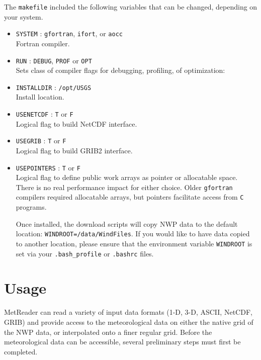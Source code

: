 \documentclass[11pt]{article}   %
\begin{document}
The \texttt{makefile} included the following variables that can be changed, depending on your
system.
\begin{itemize}
\item \texttt{SYSTEM} : \texttt{gfortran}, \texttt{ifort}, or \texttt{aocc}\\
Fortran compiler.
\item \texttt{RUN} : \texttt{DEBUG}, \texttt{PROF} or \texttt{OPT}\\
Sets class of compiler flags for debugging, profiling, of optimization:
\item \texttt{INSTALLDIR} : \texttt{/opt/USGS} \\
Install location.
\item \texttt{USENETCDF} : \texttt{T} or \texttt{F}\\
Logical flag to build NetCDF interface.
\item \texttt{USEGRIB} : \texttt{T} or \texttt{F}\\
Logical flag to build GRIB2 interface.
\item \texttt{USEPOINTERS} : \texttt{T} or \texttt{F}\\
Logical flag to define public work arrays as pointer or allocatable space. There is no
real performance impact for either choice. Older \texttt{gfortran} compilers
required allocatable arrays, but pointers facilitate access from \texttt{C} programs.

Once installed, the download scripts will copy NWP data to the default location:
\texttt{WINDROOT=/data/WindFiles}.  If you would like to have data copied to another
location, please ensure that the environment variable \texttt{WINDROOT} is set via
your \texttt{.bash\_profile} or \texttt{.bashrc} files.
\end{itemize}

\clearpage
\section{Usage}
MetReader can read a variety of input data formats (1-D, 3-D, ASCII, NetCDF, GRIB) and
provide access to the meteorological data on either the native grid of the NWP data, or interpolated
onto a finer regular grid.  Before the meteorological data can be accessible, several preliminary steps
must first be completed.
\end{document}
